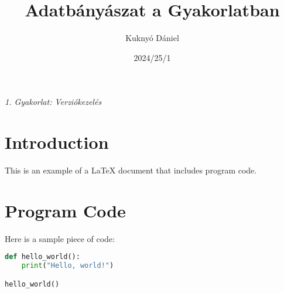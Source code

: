 \documentclass{article}
\title{Adatbányászat a Gyakorlatban}
\author{Kuknyó Dániel}
\date{2024/25/1}
\begin{document}
\maketitle

\begin{center}
\large\textit{1. Gyakorlat: Verziókezelés}
\end{center}

\section*{Introduction}
This is an example of a LaTeX document that includes program code.

\section*{Program Code}
Here is a sample piece of code:

\begin{lstlisting}[language=Python, caption=Sample Python Code]
def hello_world():
    print("Hello, world!")

hello_world()
\end{lstlisting}
\end{document}
